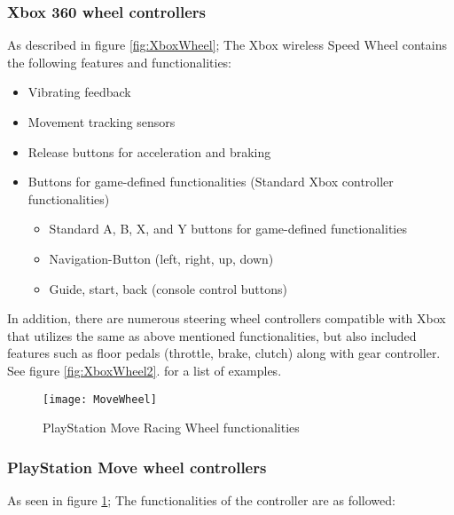\subsubsection*{Xbox 360 wheel controllers}
\parencite{Xbox2013}\newline
As described in figure \ref{fig:XboxWheel}; The Xbox wireless Speed Wheel contains the following features and functionalities:

\begin{itemize}
\item Vibrating feedback
\item Movement tracking sensors
\item Release buttons for acceleration and braking
\item Buttons for game-defined functionalities (Standard Xbox controller functionalities)
	\begin{itemize}
		\item Standard A, B, X, and Y buttons for game-defined functionalities
		\item Navigation-Button (left, right, up, down)
		\item Guide, start, back (console control buttons)
	\end{itemize}
\end{itemize}

In addition, there are numerous steering wheel controllers compatible with Xbox that utilizes the same as above mentioned functionalities, but also included features such as floor pedals (throttle, brake, clutch) along with gear controller. See figure \ref{fig:XboxWheel2}. for a list of examples.
\bigskip

\begin{figure}[h]
\centering
\texttt{[image: MoveWheel]}
\caption{PlayStation Move Racing Wheel functionalities \parencite{Move2013}}
\label{fig:MoveWheel}
\end{figure}


\subsubsection*{PlayStation Move wheel controllers}
\parencite{Move2013}\newline
As seen in figure \ref{fig:MoveWheel}; The functionalities of the controller are as followed:

